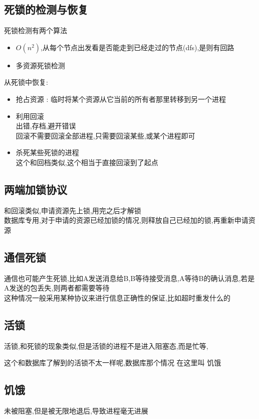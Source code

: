 \documentclass[UTF8,a4paper]{ctexart}
\begin{document}
\subsection{死锁的检测与恢复}
死锁检测有两个算法
\begin{itemize}
	\item $O(n^2)$,从每个节点出发看是否能走到已经走过的节点(dfs),是则有回路
	\item 多资源死锁检测
\end{itemize}

从死锁中恢复:
\begin{itemize}
	\item 抢占资源 : 临时将某个资源从它当前的所有者那里转移到另一个进程
	\item 利用回滚\\
	      出错,存档,避开错误\\
	      回滚不需要回滚全部进程,只需要回滚某些,或某个进程即可
	\item 杀死某些死锁的进程\\
	      这个和回档类似,这个相当于直接回滚到了起点
\end{itemize}

\subsection{两端加锁协议}
和回滚类似,申请资源先上锁,用完之后才解锁\\
数据库专用,对于申请的资源已经加锁的情况,则释放自己已经加的锁,再重新申请资源

\subsection{通信死锁}
通信也可能产生死锁,比如A发送消息给B,B等待接受消息,A等待B的确认消息,若是A发送的包丢失,则两者都需要等待\\
这种情况一般采用某种协议来进行信息正确性的保证,比如超时重发什么的

\subsection{活锁}
活锁,和死锁的现象类似,但是活锁的进程不是进入阻塞态,而是忙等,

{\color{red}这个和数据库了解到的活锁不太一样呢,数据库那个情况 在这里叫 饥饿}

\subsection{饥饿}
未被阻塞,但是被无限地退后,导致进程毫无进展
\end{document}
